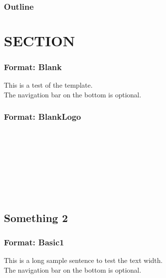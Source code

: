 \documentclass[compress]{beamer}
\begin{document}
\begin{frame}[Title]
    \titlepage
\end{frame}


\begin{frame}[ToC] \frametitle{Outline}
\setcounter{tocdepth}{2}
\hfill
\parbox[t]{.95\textwidth}{
  \begin{minipage}[c][0.75\textheight]{\textwidth}
      \linespread{1}
      \tableofcontents
  \end{minipage}
}
\end{frame}

\section[SECTION]{SECTION}

\begin{frame}[Blank] \frametitle{Format: Blank}
    This is a test of the template.\\
    The navigation bar on the bottom is optional.
\end{frame}

\begin{frame}[BlankLogo] \frametitle{Format: BlankLogo}
    {\color{VTorange}{This is VTorange}}\\
    {\color{VTmaroon}{This is VTmaroon}}\\
    {\color{BIdarkblue}{This is BIdarkblue}}\\
    {\color{BIaquablue}{This is BIaquablue}}\\
    {\color{BIcoolgrey}{This is BIcoolgrey}}\\
    {\color{BIlightblue}{This is BIlightblue}}\\
    {\color{BIlightgreen}{This is BIlightgreen}}\\
\end{frame}


\subsection[Something 2]{Something 2}

\begin{frame}[Basic1] \frametitle{Format: Basic1}
    This is a long sample sentence to test the text width.\\
    The navigation bar on the bottom is optional.
\end{frame}
\end{document}
